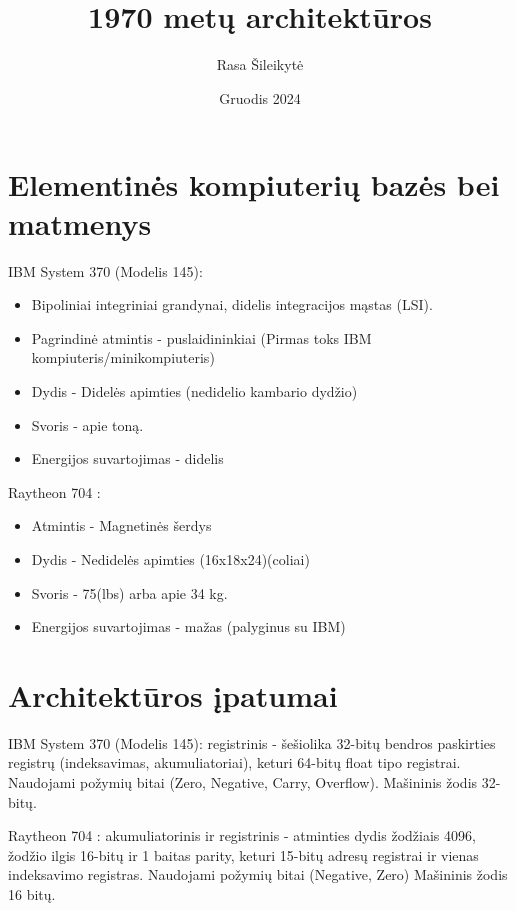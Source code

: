 \documentclass{article}
\title{\bold{IBM System 370 vs. Raytheon 704} \\1970 metų architektūros}
\author{Rasa Šileikytė}
\date{Gruodis 2024}
\begin{document}
\maketitle

\section*{Elementinės kompiuterių bazės bei matmenys}
\begin{multicols}{2}
IBM System 370 (Modelis 145):
\begin{itemize}
\item Bipoliniai integriniai grandynai, didelis integracijos mąstas (LSI).
\item Pagrindinė atmintis - puslaidininkiai (Pirmas toks IBM kompiuteris/minikompiuteris)
\item Dydis - Didelės apimties (nedidelio kambario dydžio)
\item Svoris - apie toną.
\item Energijos suvartojimas - didelis
\end{itemize}

\columnbreak

Raytheon 704 :
\begin{itemize}
\item Atmintis - Magnetinės šerdys
\item Dydis - Nedidelės apimties (16x18x24)(coliai)
\item Svoris - 75(lbs) arba apie 34 kg.
\item Energijos suvartojimas - mažas (palyginus su IBM)
\end{itemize}
\end{multicols}
\section*{Architektūros įpatumai}
\begin{multicols}{2}
IBM System 370 (Modelis 145): registrinis - šešiolika 32-bitų bendros paskirties registrų (indeksavimas, akumuliatoriai), keturi 64-bitų float tipo registrai. Naudojami požymių bitai (Zero, Negative, Carry, Overflow). Mašininis žodis 32-bitų.

\columnbreak
Raytheon 704 : akumuliatorinis ir registrinis - atminties dydis žodžiais 4096, žodžio ilgis 16-bitų ir 1 baitas parity, keturi 15-bitų adresų registrai ir vienas indeksavimo registras. Naudojami požymių bitai (Negative, Zero) Mašininis žodis 16 bitų.
\end{multicols}
\end{document}
